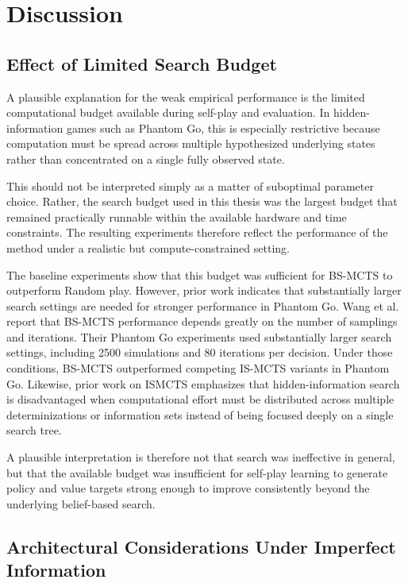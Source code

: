 \documentclass[12pt,oneside,openright]{article}
\begin{document}
\section{Discussion}

\subsection{Effect of Limited Search Budget}

A plausible explanation for the weak empirical performance is the limited computational budget available during self-play and evaluation. In hidden-information games such as Phantom Go, this is especially restrictive because computation must be spread across multiple hypothesized underlying states rather than concentrated on a single fully observed state.

This should not be interpreted simply as a matter of suboptimal parameter choice. Rather, the search budget used in this thesis was the largest budget that remained practically runnable within the available hardware and time constraints. The resulting experiments therefore reflect the performance of the method under a realistic but compute-constrained setting.

The baseline experiments show that this budget was sufficient for BS-MCTS to outperform Random play. However, prior work indicates that substantially larger search settings are needed for stronger performance in Phantom Go.
Wang et al. report that BS-MCTS performance depends greatly on the number of samplings and iterations. Their Phantom Go experiments used substantially larger search settings, including 2500 simulations and 80 iterations per decision. Under those conditions, BS-MCTS outperformed competing IS-MCTS variants in Phantom Go\cite{Wang2015bsmcts}.
Likewise, prior work on ISMCTS emphasizes that hidden-information search is disadvantaged when computational effort must be distributed across multiple determinizations or information sets instead of being focused deeply on a single search tree\cite{Wang2015bsmcts}\cite{Cowling2012ismcts}.

A plausible interpretation is therefore not that search was ineffective in general, but that the available budget was insufficient for self-play learning to generate policy and value targets strong enough to improve consistently beyond the underlying belief-based search.

\subsection{Architectural Considerations Under Imperfect Information}
\end{document}
